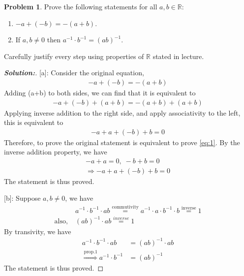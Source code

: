 \documentclass[12pt]{article}
\theoremstyle{definition}\newtheorem{problem}{Problem}
\newenvironment{solution}{\begin{proof}[\bfseries\textup{Solution:}]}{\end{proof}}
\begin{document}
\newpage
\begin{problem}
Prove the following statements for all $a,b\in\mathbb{R}$:
\begin{enumerate}
\item $-a + (-b) = -(a+b)$.
\item If $a,b\neq 0$ then $a^{-1}\cdot b^{-1} = (ab)^{-1}$.
\end{enumerate}
Carefully justify every step using properties of $\mathbb{R}$ stated in lecture.
\end{problem}

\begin{solution}
[a]:
Consider the original equation, \begin{align} 
    -a + (-b) = -(a+b) 
\end{align}
Adding (a+b) to both sides, we can find that it is equivalent to \begin{align} 
    -a +(-b) + (a+b) = -(a+b)+(a+b) 
\end{align}
Applying inverse addition to the right side, and apply associativity to the left, this is equivalent to 
\begin{align} \label{eq:1}
     -a +a +(-b) +b = 0
\end{align}
Therefore, to prove the original statement is equivalent to prove \autoref{eq:1}.
By the inverse addition property, we have \begin{align} 
    -a + a = 0 , \; -b + b = 0 \\
    \Rightarrow -a + a + (-b) + b = 0
\end{align}
The statement is thus proved.

[b]:
Suppose $ a, b \neq 0 $, we have\begin{align} 
    &a^{-1} \cdot b^{-1} \cdot ab \stackrel{\text{commutivity}}{=} a^{-1} \cdot a \cdot b^{-1} \cdot b \stackrel{\text{inverse}}{=}1 \\
 \text{also,} \; &(ab)^{-1} \cdot ab \stackrel{inverse}{=} 1
\end{align}
By transivity, we have \begin{align} 
    a^{-1} \cdot b^{-1} \cdot ab &= (ab)^{-1} \cdot ab \\
    \stackrel{\text{prop.1}}{\Rightarrow} a^{-1} \cdot b^{-1} &= (ab)^{-1}
\end{align}
The statement is thus proved.
\end{solution}
\end{document}
